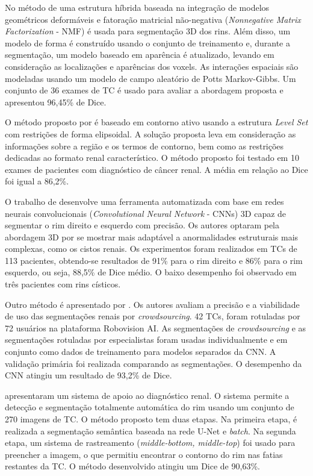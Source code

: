 No método de  uma estrutura híbrida baseada na integração de modelos geométricos deformáveis e fatoração matricial não-negativa (\textit{Nonnegative Matrix Factorization} - NMF) é usada para segmentação 3D dos rins. Além disso, um modelo de forma é construído usando o conjunto de treinamento e, durante a segmentação, um modelo baseado em aparência é atualizado, levando em consideração as localizações e aparências dos voxels. As interações espaciais são modeladas usando um modelo de campo aleatório de Potts Markov-Gibbs. Um conjunto de 36 exames de TC é usado para avaliar a abordagem proposta e apresentou 96,45\% de Dice. 

O método proposto por  é baseado em contorno ativo usando a estrutura \textit{Level Set} com restrições de forma elipsoidal. A solução proposta leva em consideração as informações sobre a região e os termos de contorno, bem como as restrições dedicadas ao formato renal característico. O método proposto foi testado em 10 exames de pacientes com diagnóstico de câncer renal. A média em relação ao Dice foi igual a 86,2\%.

O trabalho de  desenvolve uma ferramenta automatizada com base em redes neurais convolucionais (\textit{Convolutional Neural Network} - CNNs) 3D capaz de segmentar o rim direito e esquerdo com precisão. Os autores optaram pela abordagem 3D por se mostrar mais adaptável a anormalidades estruturais mais complexas, como os cistos renais. Os experimentos foram realizados em TCs de 113 pacientes, obtendo-se resultados de 91\% para o rim direito e 86\% para o rim esquerdo, ou seja, 88,5\% de Dice médio. O baixo desempenho foi observado em três pacientes com rins císticos.

Outro método é apresentado por . Os autores avaliam a precisão e a viabilidade de uso das segmentações renais por \textit{crowdsourcing}. 42 TCs, foram rotuladas por 72 usuários na plataforma Robovision AI. As segmentações de \textit{crowdsourcing} e as segmentações rotuladas por especialistas foram usadas individualmente e em conjunto como dados de treinamento para modelos separados da CNN. A validação primária foi realizada comparando as segmentações. O desempenho da CNN atingiu um resultado de 93,2\% de Dice.

 apresentaram um sistema de apoio ao diagnóstico renal. O sistema permite a detecção e segmentação totalmente automática do rim usando um conjunto de 270 imagens de TC. O método proposto tem duas etapas. Na primeira etapa, é realizada a segmentação semântica baseada na rede U-Net e \textit{batch}. Na segunda etapa, um sistema de rastreamento (\textit{middle-bottom, middle-top}) foi usado para preencher a imagem, o que permitiu encontrar o contorno do rim nas fatias restantes da TC. O método desenvolvido atingiu um Dice de 90,63\%.

